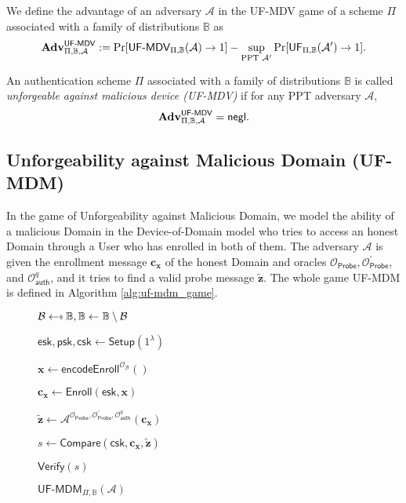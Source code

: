 We define the advantage of an adversary $\mathcal{A}$ in the \textsf{UF-MDV} game of a scheme $\Pi$ associated with a family of distributions $\mathbb{B}$ as
\[
	\mathbf{Adv}^{\textsf{UF-MDV}}_{\Pi, \mathbb{B}, \mathcal{A}} := \Pr[{\textsf{UF-MDV}}_{\Pi, \mathbb{B}}(\mathcal{A}) \to 1] -
	\sup_{\text{PPT } \mathcal{A}^\prime} \Pr[{\textsf{UF}}_{\Pi, \mathbb{B}}(\mathcal{A}^\prime) \to 1].
\]

An authentication scheme $\Pi$ associated with a family of distributions $\mathbb{B}$ is called \emph{unforgeable against malicious device (UF-MDV)} if for any PPT adversary $\mathcal{A}$,
\[
	\mathbf{Adv}^{\textsf{UF-MDV}}_{\Pi, \mathbb{B}, \mathcal{A}} = \mathsf{negl}.
\]



\subsection{Unforgeability against Malicious Domain (UF-MDM)}
\label{sec:uf-mdm_game}

In the game of Unforgeability against Malicious Domain, we model the ability of a malicious \textsf{Domain} in the Device-of-Domain model who tries to access an honest \textsf{Domain} through a \textsf{User} who has enrolled in both of them.
The adversary $\mathcal{A}$ is given the enrollment message $\mathbf{c_x}$ of the honest \textsf{Domain} and oracles $\mathcal{O}_\textsf{Probe}, \mathcal{O}_\textsf{Probe}^\prime$, and $ \mathcal{O}_\textsf{auth}^q$, and it tries to find a valid probe message $\mathbf{\tilde{z}}$.
The whole game \textsf{UF-MDM} is defined in Algorithm \ref{alg:uf-mdm_game}.

\begin{figure}[h]
\centering

	\begin{minipage}[t]{0.5\linewidth}
	\begin{algorithm}[H]
	\caption{${\textsf{UF-MDM}}_{\Pi, \mathbb{B}}(\mathcal{A})$}
	\label{alg:uf-mdm_game}
	\begin{algorithmic}[1]
		\State $\mathcal{B} \getsdollar \mathbb{B}, \mathbb{B} \gets \mathbb{B} \setminus \mathcal{B}$

		\State $\textsf{esk}, \textsf{psk}, \textsf{csk} \gets \textsf{Setup}(1^\lambda)$

		\State $\mathbf{x} \gets \textsf{encodeEnroll}^{\mathcal{O}_{\mathcal{B}}}()$

		\State $\mathbf{c_x} \gets \textsf{Enroll}(\textsf{esk}, \mathbf{x})$

		\State ${\mathbf{\tilde{z}}} \gets \mathcal{A}^{ \mathcal{O}_\textsf{Probe}, \mathcal{O}_\textsf{Probe}^\prime, \mathcal{O}_\textsf{auth}^q } ( \mathbf{c_x} )$

		\State $s \gets \textsf{Compare}( \textsf{csk}, \mathbf{c_x}, \mathbf{\tilde{z}} )$

		\State \Return $\textsf{Verify}(s)$
	\end{algorithmic}
	\end{algorithm}
	\end{minipage}

\label{fig:uf-mdm_game}
\end{figure}

